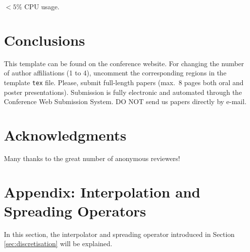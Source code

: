 \documentclass[twoside,a4paper]{article}
\begin{document}
    



$<5\%$ CPU usage. 
\section{Conclusions}\label{sec:conclusion}
This template can be found on the conference website.
For changing the number of author affiliations (1 to 4), uncomment the corresponding regions in the template \texttt{tex} file.
Please, submit full-length papers (max.~8 pages both oral and poster presentations).
Submission is fully electronic and automated through the Conference Web Submission System.
DO NOT send us papers directly by e-mail.

\section{Acknowledgments}
Many thanks to the great number of anonymous reviewers!

\nocite{*}


\section{Appendix: Interpolation and Spreading Operators}
\label{app:interpol}
In this section, the interpolator and spreading operator introduced in Section \ref{sec:discretisation} will be explained.
\end{document}

